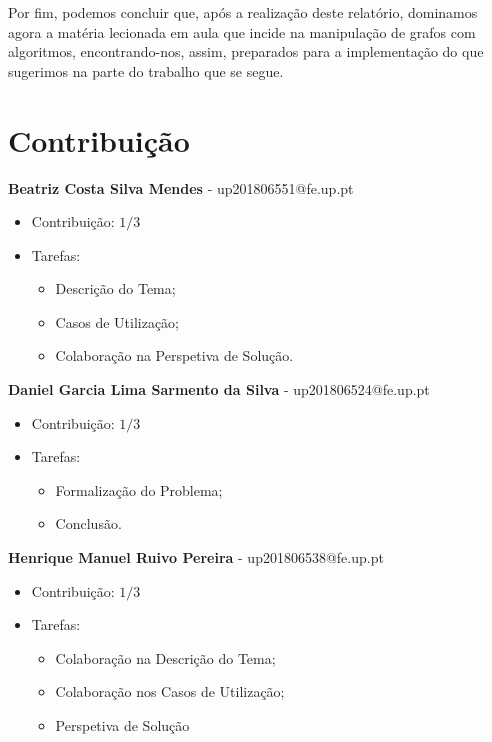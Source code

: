\documentclass[article, a4paper, 12pt, oneside]{memoir}
\begin{document}
Por fim, podemos concluir que, após a realização deste relatório, dominamos agora a matéria lecionada em aula que incide na manipulação de grafos com algoritmos, encontrando-nos, assim, preparados para a implementação do que sugerimos na parte do trabalho que se segue.


\newpage
\chapter[Contribuição][Contribuição]{Contribuição} \label{\thechapter}

\textbf{Beatriz Costa Silva Mendes} - up201806551@fe.up.pt

\begin{itemize}
\item Contribuição: $1/3$
\item Tarefas:
	\begin{itemize}
	\item Descrição do Tema;
	\item Casos de Utilização;
	\item Colaboração na Perspetiva de Solução.
	\end{itemize}
\end{itemize}


\textbf{Daniel Garcia Lima Sarmento da Silva} - up201806524@fe.up.pt

\begin{itemize}
\item Contribuição: $1/3$
\item Tarefas:
	\begin{itemize}
	\item Formalização do Problema;
	\item Conclusão.
	\end{itemize}
\end{itemize}


\textbf{Henrique Manuel Ruivo Pereira} - up201806538@fe.up.pt

\begin{itemize}
\item Contribuição: $1/3$
\item Tarefas:
	\begin{itemize}
	\item Colaboração na Descrição do Tema;
	\item Colaboração nos Casos de Utilização;
	\item Perspetiva de Solução
	\end{itemize}
\end{itemize}
\end{document}
